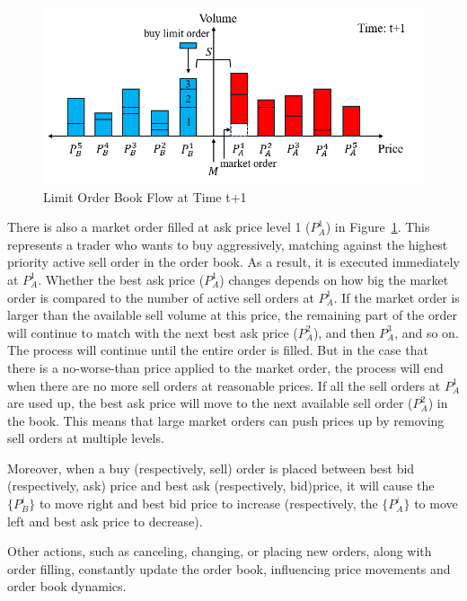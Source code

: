 \begin{figure}[h]
    \centering
    \includegraphics[width=0.8\linewidth]{figures/order_book_t_1.png}
    \caption{Limit Order Book Flow at Time t+1}
    \label{fig: order_book_t_1}
\end{figure}

There is also a market order filled at ask price level 1 ($P_A^1$) in Figure~\ref{fig: order_book_t_1}. This represents a trader who wants to buy aggressively, matching against the highest priority active sell order in the order book. As a result, it is executed immediately at $P_A^1$. Whether the best ask price ($P_A^1$) changes depends on how big the market order is compared to the number of active sell orders at $P_A^1$. If the market order is larger than the available sell volume at this price, the remaining part of the order will continue to match with the next best ask price ($P_A^2$), and then $P_A^3$, and so on. The process will continue until the entire order is filled. But in the case that there is a no-worse-than price applied to the market order, the process will end when there are no more sell orders at reasonable prices. If all the sell orders at $P_A^1$ are used up, the best ask price will move to the next available sell order ($P_A^2$) in the book. This means that large market orders can push prices up by removing sell orders at multiple levels.

Moreover, when a buy (respectively, sell) order is placed between best bid (respectively, ask) price and best ask (respectively, bid)price, it will cause the $\{P_B ^ {i}\}$ to move right and best bid price to increase (respectively, the $\{P_A ^ {i}\}$ to move left and best ask price to decrease). 

Other actions, such as canceling, changing, or placing new orders, along with order filling, constantly update the order book, influencing price movements and order book dynamics.

